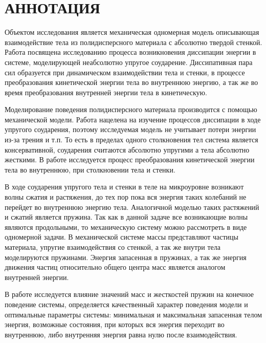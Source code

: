 \chapter*{АННОТАЦИЯ}

Объектом исследования является механическая одномерная модель описывающая взаимодействие тела из полидисперсного материала с абсолютно твердой стенкой.
Работа посвящена исследованию процесса возникновения диссипации энергии в системе, моделирующей неабсолютно упругое соударение.
Диссипативная пара сил образуется при динамическом взаимодействии тела и стенки, в процессе преобразования кинетической энергии тела во внутреннюю энергию, а так же во время преобразования внутренней энергии тела в кинетическую.

Моделирование поведения полидисперсного материала производится с помощью
механической модели. Работа нацелена на изучение процессов диссипации в ходе упругого соударения, поэтому
исследуемая модель не учитывает потери энергии из-за трения и т.п. То есть в пределах
одного столкновения тел система является консервативной, соударения считаются
абсолютно упругими а тела абсолютно жесткими. В работе исследуется процесс
преобразования кинетической энергии тела во внутреннюю, при столкновении тела и стенки.

В ходе соударения упругого тела и стенки в теле на микроуровне возникают волны сжатия и растяжения, до тех пор пока вся энергия таких колебаний не перейдет во внутреннюю энергию тела. Аналогичной моделью таких растяжений и сжатий является пружина. Так как в данной задаче все возникающие волны являются продольными, то механическую систему можно рассмотреть в виде одномерной задачи. В механической системе массы представляют частицы материала, упругие взаимодействия со стенкой, а так же внутри тела моделируются пружинами. Энергия запасенная в пружинах, а так же энергия движения частиц относительно общего центра масс является аналогом внутренней энергии.

В работе исследуется влияние значений масс и жесткостей пружин на конечное поведение системы,
определяется качественный характер поведения модели и оптимальные параметры системы:
минимальная и максимальная запасенная телом энергия, возможные состояния, при которых вся энергия переходит во внутреннюю, либо внутренняя энергия равна нулю после взаимодействия.


